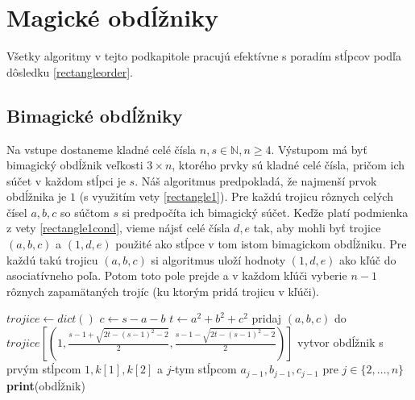 \section{Magické obdĺžniky}

Všetky algoritmy v tejto podkapitole pracujú efektívne s poradím stĺpcov podľa dôsledku \ref{rectangleorder}.

\subsection{Bimagické obdĺžniky}

\begin{alg}
\label{algbos}
Na vstupe dostaneme kladné celé čísla $n,s \in \mathbb{N}, n \geq 4$. Výstupom má byť bimagický obdĺžnik veľkosti $3 \times n$, ktorého prvky sú kladné celé čísla, pričom ich súčet v každom stĺpci je $s$. Náš algoritmus predpokladá, že najmenší prvok obdĺžnika je $1$ (s využitím vety \ref{rectangle1}). Pre každú trojicu rôznych celých čísel $a,b,c$ so súčtom $s$ si predpočíta ich bimagický súčet. Keďže platí podmienka z vety \ref{rectangle1cond}, vieme nájsť celé čísla $d,e$ tak, aby mohli byť trojice $(a,b,c)$ a $(1,d,e)$ použité ako stĺpce v tom istom bimagickom obdĺžniku. Pre každú takú trojicu $(a,b,c)$ si algoritmus uloží hodnoty $(1,d,e)$ ako kľúč do asociatívneho poľa. Potom toto pole prejde a v každom kľúči vyberie $n-1$ rôznych zapamätaných trojíc (ku ktorým pridá trojicu v kľúči).
\end{alg}

\begin{algorithmic}
\STATE $trojice \gets dict()$
		\STATE $c \gets s-a-b$
		\STATE $t \gets a^2+b^2+c^2$
			\STATE pridaj $(a,b,c)$ do $trojice[(1, \frac{s-1 + \sqrt{2t - (s-1)^2 - 2}}{2}, \frac{s-1 - \sqrt{2t - (s-1)^2 - 2}}{2})]$
		\ENDIF
	\ENDFOR
\ENDFOR
{}
				\STATE vytvor obdĺžnik s prvým stĺpcom $1, k[1], k[2]$ a $j$-tym stĺpcom $a_{j-1}, b_{j-1}, c_{j-1}$ pre $j \in \{2, \dots , n\}$
					\STATE \textbf{print}(obdĺžnik)
				\ENDIF
			\ENDFOR
		\ENDIF
	\ENDFOR
\ENDFOR
\end{algorithmic}

